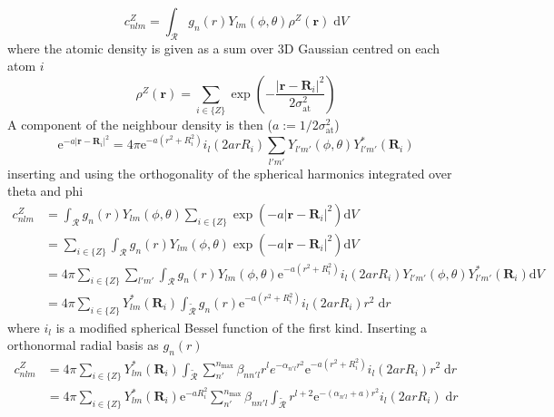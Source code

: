 \documentclass[../main.tex]{subfiles}
\begin{document}
\begin{equation}
	c_{nlm}^Z = \int_\mathcal{R} g_n(r) Y_{lm}(\phi,\theta) \rho^Z(\boldsymbol{r})\; \text{d}V
\end{equation}
where the atomic density is given as a sum over 3D Gaussian centred on each atom $i$ 
\begin{equation}
	\rho^Z(\boldsymbol{r}) = \sum_{i \in \{Z\}} \exp\left(-\frac{|\boldsymbol{r} - \boldsymbol{R}_i|^2}{2\sigma_\text{at}^2}\right)
\end{equation}
A component of the neighbour density is then ($a := 1/2\sigma_\text{at}^2$) 
\begin{equation}
	\text{e}^{-a|\boldsymbol{r} - \boldsymbol{R}_i|^2} = 4\pi \text{e}^{-a(r^2+R_i^2)}i_l(2arR_i) \sum_{l'm'}Y_{l'm'}(\phi, \theta) Y_{l'm'}^*(\boldsymbol{R}_i)
\end{equation}
inserting and using the orthogonality of the spherical harmonics integrated over theta and phi
\begin{equation}
	\begin{split}
		c_{nlm}^Z &= \int_\mathcal{R} g_n(r) Y_{lm}(\phi,\theta)  \sum_{i \in \{Z\}} \exp\left(-a|\boldsymbol{r} - \boldsymbol{R}_i|^2\right) \text{d}V \\
		&= \sum_{i \in \{Z\}} \int_\mathcal{R} g_n(r) Y_{lm}(\phi,\theta) \exp\left(-a|\boldsymbol{r} - \boldsymbol{R}_i|^2\right) \text{d}V \\
		&=  4\pi \sum_{i \in \{Z\}}\sum_{l'm'} \int_\mathcal{R} g_n(r) Y_{lm}(\phi,\theta) \text{e}^{-a(r^2+R_i^2)}i_l(2arR_i)Y_{l'm'}(\phi, \theta) Y_{l'm'}^*(\boldsymbol{R}_i)  \text{d}V \\
		&=4\pi \sum_{i \in \{Z\}}Y_{lm}^*(\boldsymbol{R}_i) \int_\mathcal{\tilde{R}} g_n(r) \text{e}^{-a(r^2+R_i^2)}i_l(2arR_i)r^2\; \text{d}r
	\end{split}
\end{equation}
where $i_l$ is a modified spherical Bessel function of the first kind. Inserting a orthonormal radial basis as $g_n(r)$
\begin{equation}
	\begin{split}
		c_{nlm}^Z &=4\pi \sum_{i \in \{Z\}}Y_{lm}^*(\boldsymbol{R}_i) \int_\mathcal{\tilde{R}} \sum_{n'}^{n_\text{max}} \beta_{nn'l}r^l e^{-\alpha_{n'l}r^2}\text{e}^{-a(r^2+R_i^2)} i_l(2arR_i)r^2\; \text{d}r \\
		&= 4\pi \sum_{i \in \{Z\}}Y_{lm}^*(\boldsymbol{R}_i)\text{e}^{-aR_i^2} \sum_{n'}^{n_\text{max}} \beta_{nn'l}\int_\mathcal{\tilde{R}} r^{l + 2}  \text{e}^{-(\alpha_{n'l} + a)r^2} i_l(2arR_i)\; \text{d}r
	\end{split}
\end{equation}
\end{document}
